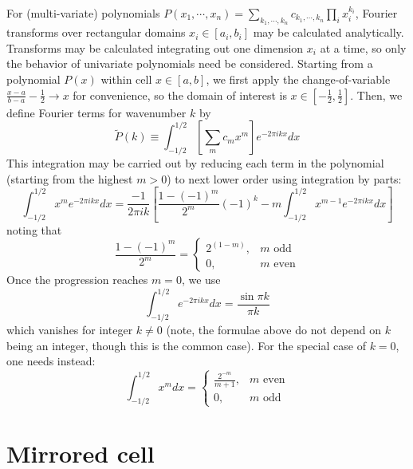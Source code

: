 \documentclass[11pt,english]{article}
\begin{document}
For (multi-variate) polynomials $P(x_1,\cdots,x_n) = \sum_{k_1,\cdots,k_n} c_{k_1,\cdots,k_n} \prod_i x_i^{k_i}$,
	Fourier transforms over rectangular domains $x_i \in [a_i,b_i]$ may be calculated analytically.
Transforms may be calculated integrating out one dimension $x_i$ at a time,
	so only the behavior of univariate polynomials need be considered.
Starting from a polynomial $P(x)$ within cell $x \in [a,b]$,
	we first apply the change-of-variable $\frac{x-a}{b-a} -\frac{1}{2} \rightarrow x$
	for convenience, so the domain of interest is $x \in \left[ -\frac{1}{2}, \frac{1}{2} \right]$.
Then, we define Fourier terms for wavenumber $k$ by
\begin{equation}
	\tilde P(k) \equiv \int_{-1/2}^{1/2} \left[ \sum_m c_m x^m \right] e^{-2\pi i k x} dx
\end{equation}
This integration may be carried out by reducing each term in the polynomial
	(starting from the highest $m > 0$) to next lower order using integration by parts:
\begin{equation}
	\int_{-1/2}^{1/2} x^m e^{-2 \pi i k x} dx
		= \frac{-1}{2\pi i k} \left[ \frac{1-(-1)^m}{2^m} (-1)^k -  m \int_{-1/2}^{1/2} x^{m-1} e^{-2\pi i k x} dx \right]
	\label{eq:ft_xn}
\end{equation}
noting that
\begin{equation}
	\frac{1-(-1)^m}{2^m} = 
	\begin{cases}
		2^{(1-m)},		& \textrm{$m$ odd}		\\
		0,				& \textrm{$m$ even}
	\end{cases}
\end{equation}
Once the progression reaches $m=0$, we use
\begin{equation}
	\int_{-1/2}^{1/2} e^{-2\pi i k x} dx = \frac{\sin \pi k}{\pi k} 
\end{equation}
which vanishes for integer $k \neq 0$ (note, the formulae above do not depend on $k$ being an integer, though this is the common case).
For the special case of $k=0$, one needs instead:
\begin{equation}
	\int_{-1/2}^{1/2} x^m dx =
	\begin{cases}
		\frac{2^{-m}}{m+1},		& \textrm{$m$ even}		\\
		0,						& \textrm{$m$ odd}
	\end{cases}
\end{equation}

\section{Mirrored cell}
\end{document}
